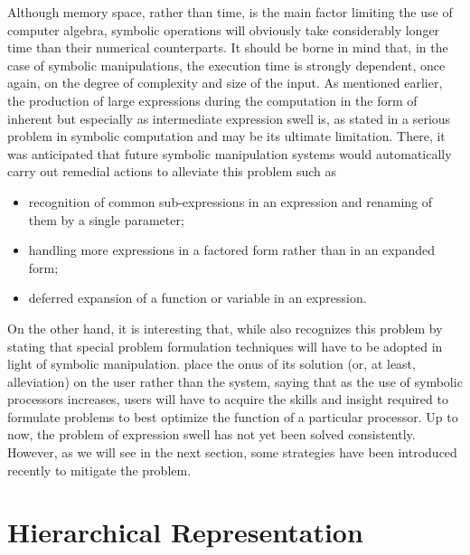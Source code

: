 Although memory space, rather than time, is the main factor limiting the use of computer algebra, symbolic operations will obviously take considerably longer time than their numerical counterparts. It should be borne in mind that, in the case of symbolic manipulations, the execution time is strongly dependent, once again, on the degree of complexity and size of the input. As mentioned earlier, the production of large expressions during the computation in the form of inherent but especially as intermediate expression swell is, as stated in \citet{noor1979computerized} a serious problem in symbolic computation and may be its ultimate limitation. There, it was anticipated that future symbolic manipulation systems would automatically carry out remedial actions to alleviate this problem such as
%
\begin{itemize}
  \setlength\itemsep{0em}
  \item recognition of common sub-expressions in an expression and renaming of them by a single parameter;
  \item handling more expressions in a factored form rather than in an expanded form;
  \item deferred expansion of a function or variable in an expression.
\end{itemize}
%
On the other hand, it is interesting that, while \citet{korncoff1979symbolic} also recognizes this problem by stating that special problem formulation techniques will have to be adopted in light of symbolic manipulation. \citeauthor{korncoff1979symbolic} place the onus of its solution (or, at least, alleviation) on the user rather than the system, saying that as the use of symbolic processors increases, users will have to acquire the skills and insight required to formulate problems to best optimize the function of a particular processor. Up to now, the problem of expression swell has not yet been solved consistently. However, as we will see in the next section, some strategies have been introduced recently to mitigate the problem.


\section{Hierarchical Representation}

